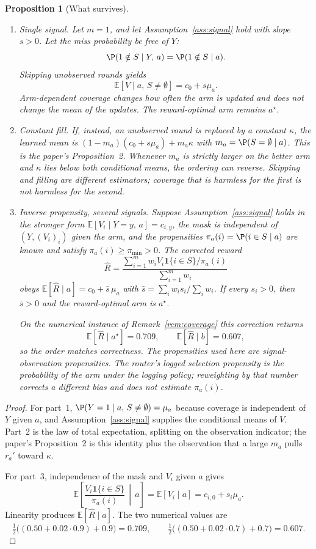 \documentclass{article}
\newtheorem{proposition}[theorem]{Proposition}
\theoremstyle{definition}
\theoremstyle{remark}
\newcommand{\E}{\mathbb{E}}
\begin{document}
\begin{proposition}[What survives]\label{prop:ipw}
\begin{enumerate}
\item \emph{Single signal.}
Let $m=1$, and let Assumption~\ref{ass:signal} hold with slope $s>0$.
Let the miss probability be free of $Y$:
\[
\P(1\notin S\mid Y,\,a)=\P(1\notin S\mid a).
\]
Skipping unobserved rounds yields
\[
\E[V\mid a,\,S\neq\emptyset]=c_0+s\mu_a.
\]
Arm-dependent coverage changes how often the arm is updated and does not change the mean of the updates. The reward-optimal arm remains $a^\star$.
\item \emph{Constant fill.} If, instead, an unobserved round is replaced by a constant $\kappa$, the learned mean is $(1-m_a)(c_0+s\mu_a)+m_a\kappa$ with $m_a=\P(S=\emptyset\mid a)$. This is the paper's Proposition~2. Whenever $m_a$ is strictly larger on the better arm and $\kappa$ lies below both conditional means, the ordering can reverse. Skipping and filling are different estimators; coverage that is harmless for the first is not harmless for the second.
\item \emph{Inverse propensity, several signals.} Suppose Assumption~\ref{ass:signal} holds in the stronger form $\E[V_i\mid Y=y,\,a]=c_{i,y}$, the mask is independent of $(Y,(V_i)_i)$ given the arm, and the propensities $\pi_a(i)=\P(i\in S\mid a)$ are known and satisfy $\pi_a(i)\ge\pi_{\min}>0$. The corrected reward
\begin{equation}\label{eq:ipw}
\hat R=\frac{\sum_{i=1}^m w_i V_i\mathbf 1\{i\in S\}/\pi_a(i)}{\sum_{i=1}^m w_i}
\end{equation}
obeys $\E[\hat R\mid a]=c_0+\bar s\,\mu_a$ with $\bar s=\sum_i w_i s_i/\sum_i w_i$. If every $s_i>0$, then $\bar s>0$ and the reward-optimal arm is $a^\star$.

On the numerical instance of Remark~\ref{rem:coverage} this correction returns
\[
\E[\hat R\mid a^\star]=0.709,\qquad\E[\hat R\mid b]=0.607,
\]
so the order matches correctness. The propensities used here are signal-observation propensities. The router's logged selection propensity is the probability of the arm under the logging policy; reweighting by that number corrects a different bias and does not estimate $\pi_a(i)$.
\end{enumerate}
\end{proposition}

\begin{proof}
For part~1, $\P(Y=1\mid a,\,S\neq\emptyset)=\mu_a$ because coverage is independent of $Y$ given $a$, and Assumption~\ref{ass:signal} supplies the conditional means of $V$. Part~2 is the law of total expectation, splitting on the observation indicator; the paper's Proposition~2 is this identity plus the observation that a large $m_a$ pulls $r_a'$ toward $\kappa$.

For part~3, independence of the mask and $V_i$ given $a$ gives
\[
\E\!\left[\frac{V_i\mathbf 1\{i\in S\}}{\pi_a(i)}\,\middle|\,a\right]
=\E[V_i\mid a]
=c_{i,0}+s_i\mu_a.
\]
Linearity produces $\E[\hat R\mid a]$. The two numerical values are
\[
\tfrac12\big((0.50+0.02\cdot 0.9)+0.9\big)=0.709,
\qquad
\tfrac12\big((0.50+0.02\cdot 0.7)+0.7\big)=0.607.
\]
\end{proof}
\end{document}
